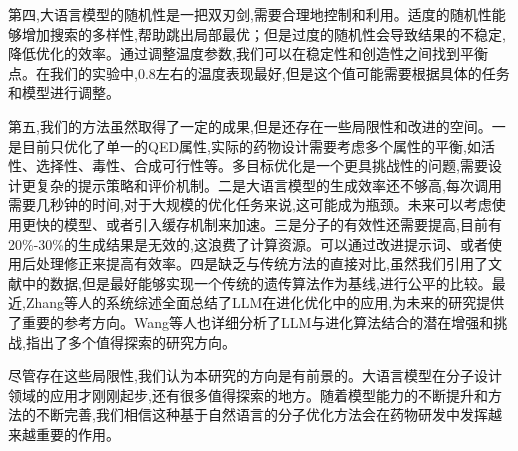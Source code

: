 第四,大语言模型的随机性是一把双刃剑,需要合理地控制和利用。适度的随机性能够增加搜索的多样性,帮助跳出局部最优；但是过度的随机性会导致结果的不稳定,降低优化的效率。通过调整温度参数,我们可以在稳定性和创造性之间找到平衡点。在我们的实验中,0.8左右的温度表现最好,但是这个值可能需要根据具体的任务和模型进行调整。

第五,我们的方法虽然取得了一定的成果,但是还存在一些局限性和改进的空间。一是目前只优化了单一的QED属性,实际的药物设计需要考虑多个属性的平衡,如活性、选择性、毒性、合成可行性等。多目标优化是一个更具挑战性的问题,需要设计更复杂的提示策略和评价机制。二是大语言模型的生成效率还不够高,每次调用需要几秒钟的时间,对于大规模的优化任务来说,这可能成为瓶颈。未来可以考虑使用更快的模型、或者引入缓存机制来加速。三是分子的有效性还需要提高,目前有20\%-30\%的生成结果是无效的,这浪费了计算资源。可以通过改进提示词、或者使用后处理修正来提高有效率。四是缺乏与传统方法的直接对比,虽然我们引用了文献中的数据,但是最好能够实现一个传统的遗传算法作为基线,进行公平的比较。最近,Zhang等人的系统综述\cite{zhang2025survey}全面总结了LLM在进化优化中的应用,为未来的研究提供了重要的参考方向。Wang等人\cite{wang2025when}也详细分析了LLM与进化算法结合的潜在增强和挑战,指出了多个值得探索的研究方向。

尽管存在这些局限性,我们认为本研究的方向是有前景的。大语言模型在分子设计领域的应用才刚刚起步,还有很多值得探索的地方。随着模型能力的不断提升和方法的不断完善,我们相信这种基于自然语言的分子优化方法会在药物研发中发挥越来越重要的作用。
